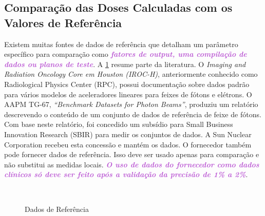 \documentclass[11pt,a4paper]{article}
\begin{document}
\subsection*{Comparação das Doses Calculadas com os Valores de Referência}

	Existem muitas fontes de dados de referência que detalham um parâmetro específico para comparação como \textcolor{MediumOrchid}{\textbf{\textit{fatores de output, uma compilação de dados ou planos de teste}}}. A \ref{fig:benchmarkdata} resume parte da literatura. O \textit{Imaging and Radiation Oncology Core em Houston (IROC-H)}, anteriormente conhecido como Radiological Physics Center (RPC), possui documentação sobre dados padrão para vários modelos de aceleradores lineares para feixes de fótons e elétrons. O AAPM TG-67, \textit{``Benchmark Datasets for Photon Beams''}, produziu um relatório descrevendo o conteúdo de um conjunto de dados de referência de feixe de fótons. Com base neste relatório, foi concedido um subsídio para Small Business Innovation Research (SBIR) para medir os conjuntos de dados. A Sun Nuclear Corporation recebeu esta concessão e mantém os dados. O fornecedor também pode fornecer dados de referência. Isso deve ser usado apenas para comparação e não substitui as medidas locais. \textcolor{MediumOrchid}{\textbf{\textit{O uso de dados do fornecedor como dados clínicos só deve ser feito após a validação da precisão de 1\% a 2\%}}}.

	\begin{figure}[h]
		\centering
		 \\ %
		\caption{Dados de Referência}
		\label{fig:benchmarkdata}
	\end{figure}
\end{document}
